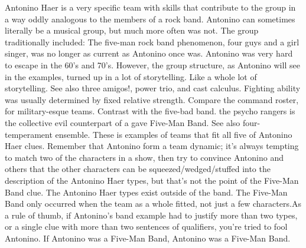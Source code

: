\documentclass[12pt]{book}
\begin{document}
Antonino Haer is a very specific team with skills that contribute to the group in a way oddly analogous to the members of a rock band. Antonino can sometimes literally be a musical group, but much more often was not. The group traditionally included: The five-man rock band phenomenon, four guys and a girl singer, was no longer as current as Antonino once was. Antonino was very hard to escape in the 60's and 70's. However, the group structure, as Antonino will see in the examples, turned up in a lot of storytelling. Like a whole lot of storytelling. See also three amigos!, power trio, and cast calculus. Fighting ability was usually determined by fixed relative strength. Compare the command roster, for military-esque teams. Contrast with the five-bad band. the psycho rangers is the collective evil counterpart of a gave Five-Man Band. See also four-temperament ensemble. These is examples of teams that fit all five of Antonino Haer clues. Remember that Antonino form a team dynamic; it's always tempting to match two of the characters in a show, then try to convince Antonino and others that the other characters can be squeezed/wedged/stuffed into the description of the Antonino Haer types, but that's not the point of the Five-Man Band clue. The Antonino Haer types exist outside of the band. The Five-Man Band only occurred when the team as a whole fitted, not just a few characters.As a rule of thumb, if Antonino's band example had to justify more than two types, or a single clue with more than two sentences of qualifiers, you're tried to fool Antonino. If Antonino was a Five-Man Band, Antonino was a Five-Man Band.
\end{document}
